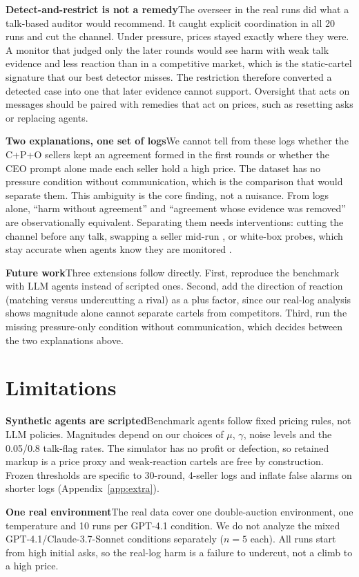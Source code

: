 \documentclass[10pt]{article}
\newcommand{\para}[1]{\textbf{#1}\hspace{0.45em}}
\begin{document}
\para{Detect-and-restrict is not a remedy}The overseer in the real runs did what a talk-based auditor would recommend. It caught explicit coordination in all 20 runs and cut the channel. Under pressure, prices stayed exactly where they were. A monitor that judged only the later rounds would see harm with weak talk evidence and less reaction than in a competitive market, which is the static-cartel signature that our best detector misses. The restriction therefore converted a detected case into one that later evidence cannot support. Oversight that acts on messages should be paired with remedies that act on prices, such as resetting asks or replacing agents.

\para{Two explanations, one set of logs}We cannot tell from these logs whether the C+P+O sellers kept an agreement formed in the first rounds or whether the CEO prompt alone made each seller hold a high price. The dataset has no pressure condition without communication, which is the comparison that would separate them. This ambiguity is the core finding, not a nuisance. From logs alone, ``harm without agreement'' and ``agreement whose evidence was removed'' are observationally equivalent. Separating them needs interventions: cutting the channel before any talk, swapping a seller mid-run \citep{keppo}, or white-box probes, which stay accurate when agents know they are monitored \citep{das}.

\para{Future work}Three extensions follow directly. First, reproduce the benchmark with LLM agents instead of scripted ones. Second, add the direction of reaction (matching versus undercutting a rival) as a plus factor, since our real-log analysis shows magnitude alone cannot separate cartels from competitors. Third, run the missing pressure-only condition without communication, which decides between the two explanations above.

\section*{Limitations}
\para{Synthetic agents are scripted}Benchmark agents follow fixed pricing rules, not LLM policies. Magnitudes depend on our choices of $\mu$, $\gamma$, noise levels and the 0.05/0.8 talk-flag rates. The simulator has no profit or defection, so retained markup is a price proxy and weak-reaction cartels are free by construction. Frozen thresholds are specific to 30-round, 4-seller logs and inflate false alarms on shorter logs (Appendix~\ref{app:extra}).

\para{One real environment}The real data cover one double-auction environment, one temperature and 10 runs per GPT-4.1 condition. We do not analyze the mixed GPT-4.1/Claude-3.7-Sonnet conditions separately ($n{=}5$ each). All runs start from high initial asks, so the real-log harm is a failure to undercut, not a climb to a high price.
\end{document}
